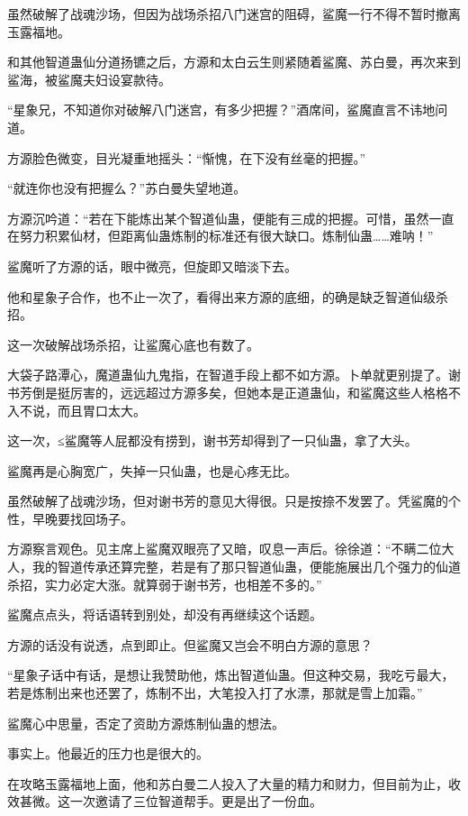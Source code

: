 
\begin{this_body}

虽然破解了战魂沙场，但因为战场杀招八门迷宫的阻碍，鲨魔一行不得不暂时撤离玉露福地。

和其他智道蛊仙分道扬镳之后，方源和太白云生则紧随着鲨魔、苏白曼，再次来到鲨海，被鲨魔夫妇设宴款待。

“星象兄，不知道你对破解八门迷宫，有多少把握？”酒席间，鲨魔直言不讳地问道。

方源脸色微变，目光凝重地摇头：“惭愧，在下没有丝毫的把握。”

“就连你也没有把握么？”苏白曼失望地道。

方源沉吟道：“若在下能炼出某个智道仙蛊，便能有三成的把握。可惜，虽然一直在努力积累仙材，但距离仙蛊炼制的标准还有很大缺口。炼制仙蛊……难呐！”

鲨魔听了方源的话，眼中微亮，但旋即又暗淡下去。

他和星象子合作，也不止一次了，看得出来方源的底细，的确是缺乏智道仙级杀招。

这一次破解战场杀招，让鲨魔心底也有数了。

大袋子路潭心，魔道蛊仙九鬼指，在智道手段上都不如方源。卜单就更别提了。谢书芳倒是挺厉害的，远远超过方源多矣，但她本是正道蛊仙，和鲨魔这些人格格不入不说，而且胃口太大。

这一次，≤鲨魔等人屁都没有捞到，谢书芳却得到了一只仙蛊，拿了大头。

鲨魔再是心胸宽广，失掉一只仙蛊，也是心疼无比。

虽然破解了战魂沙场，但对谢书芳的意见大得很。只是按捺不发罢了。凭鲨魔的个性，早晚要找回场子。

方源察言观色。见主席上鲨魔双眼亮了又暗，叹息一声后。徐徐道：“不瞒二位大人，我的智道传承还算完整，若是有了那只智道仙蛊，便能施展出几个强力的仙道杀招，实力必定大涨。就算弱于谢书芳，也相差不多的。”

鲨魔点点头，将话语转到别处，却没有再继续这个话题。

方源的话没有说透，点到即止。但鲨魔又岂会不明白方源的意思？

“星象子话中有话，是想让我赞助他，炼出智道仙蛊。但这种交易，我吃亏最大，若是炼制出来也还罢了，炼制不出，大笔投入打了水漂，那就是雪上加霜。”

鲨魔心中思量，否定了资助方源炼制仙蛊的想法。

事实上。他最近的压力也是很大的。

在攻略玉露福地上面，他和苏白曼二人投入了大量的精力和财力，但目前为止，收效甚微。这一次邀请了三位智道帮手。更是出了一份血。


\end{this_body}
